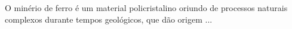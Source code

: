   O minério de ferro é um material policristalino oriundo de processos
  naturais complexos durante tempos geológicos, que dão origem ...
